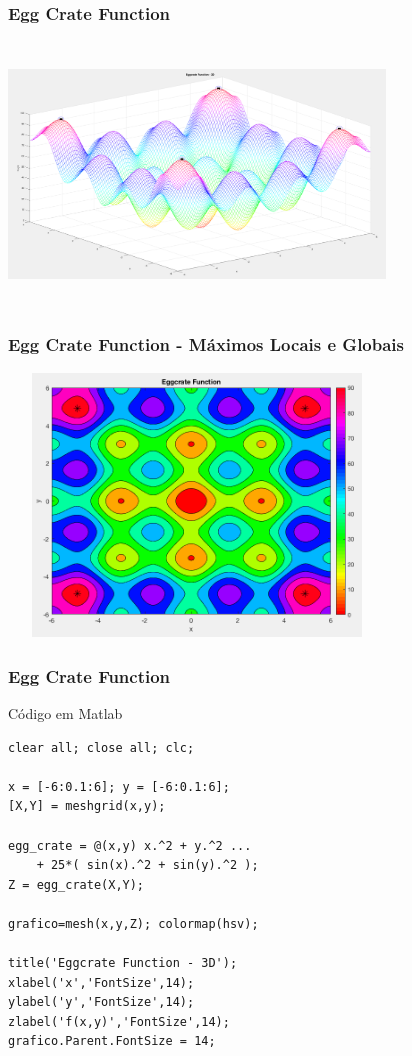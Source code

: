 \documentclass{beamer}
\begin{document}
\begin{frame}
	{
	\frametitle{Egg Crate Function}
	\centering
	\includegraphics[width=10cm,height=7cm]{eggcrate_max.png}
	}
	{
	\frametitle{Egg Crate Function - Máximos Locais e Globais} 	
	\centering
	\includegraphics[width=10cm,height=7cm]{egg_crate_2d.png}
	}	
\end{frame}

\begin{frame}[fragile]
	\frametitle{Egg Crate Function}
	\begin{block}{Código em Matlab}
		\begin{lstlisting}
clear all; close all; clc;

x = [-6:0.1:6]; y = [-6:0.1:6];
[X,Y] = meshgrid(x,y);

egg_crate = @(x,y) x.^2 + y.^2 ...
    + 25*( sin(x).^2 + sin(y).^2 );
Z = egg_crate(X,Y);

grafico=mesh(x,y,Z); colormap(hsv);

title('Eggcrate Function - 3D');
xlabel('x','FontSize',14); 
ylabel('y','FontSize',14); 
zlabel('f(x,y)','FontSize',14);
grafico.Parent.FontSize = 14;
		\end{lstlisting}
	\end{block}	
\end{frame}
\end{document}
